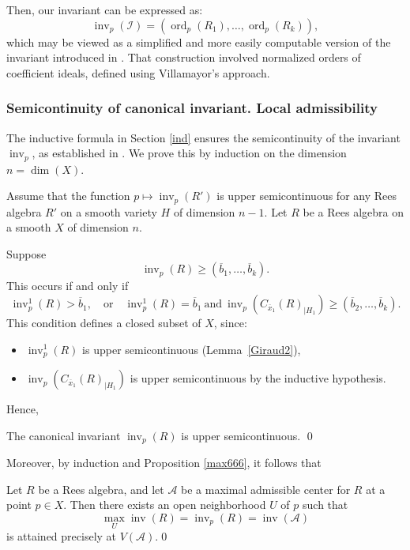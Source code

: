 \documentclass{amsart}
\newcommand{\inv}{{\operatorname{inv}}}
\begin{document}

Then, our invariant can be expressed as:
\[
\inv_p(\mathcal{I}) = (\operatorname{ord}_p(R_1), \ldots, \operatorname{ord}_p(R_k)),
\]
which may be viewed as a simplified and more easily computable version of the invariant introduced in \cite{ATW-weighted}. That construction involved normalized orders of coefficient ideals, defined using Villamayor's approach.
\subsubsection{Semicontinuity of canonical invariant. Local admissibility} \label{semi1}

The inductive formula in Section \ref{ind} ensures the semicontinuity of the invariant \( \inv_p \), as established in \cite{ATW-weighted}. We prove this by induction on the dimension \( n = \dim(X) \).

Assume that the function \( p \mapsto \inv_p(R') \) is upper semicontinuous for any Rees algebra \( R' \) on a smooth variety \( H \) of dimension \( n - 1 \). Let \( R \) be a Rees algebra on a smooth \( X \) of dimension \( n \).

Suppose
\[
\inv_p(R) \geq (\overline{b}_1, \ldots, \overline{b}_k).
\]
This occurs if and only if
\[
\inv^1_p(R) > \overline{b}_1,
\quad \text{or} \quad
\inv^1_p(R) = \overline{b}_1 \ \text{and} \ 
\inv_p(C_{\overline{x}_1}(R)_{|H_1}) \geq (\overline{b}_2, \ldots, \overline{b}_k).
\]
This condition defines a closed subset of \( X \), since:
\begin{itemize}
    \item \( \inv^1_p(R) \) is upper semicontinuous (Lemma~\ref{Giraud2}),
    \item \( \inv_p(C_{\overline{x}_1}(R)_{|H_1}) \) is upper semicontinuous by the inductive hypothesis.
\end{itemize}

Hence, \begin{lemma} \label{max88}The canonical invariant \( \inv_p(R) \) is upper semicontinuous. \qed
\end{lemma}
Moreover, by induction and Proposition \ref{max666}, it follows that
\begin{lemma}[see also \cite{ATW-weighted}] \label{max8}
Let $R$ be a Rees algebra, and let $\mathcal{A}$ be a maximal admissible center for $R$ at a point $p \in X$. Then there exists an open neighborhood $U$ of $p$ such that 
\[
\max_U \inv(R) = \inv_p(R) = \inv(\mathcal{A})
\]
is attained precisely at $V(\mathcal{A})$.\qed 
\end{lemma}
\end{document}
